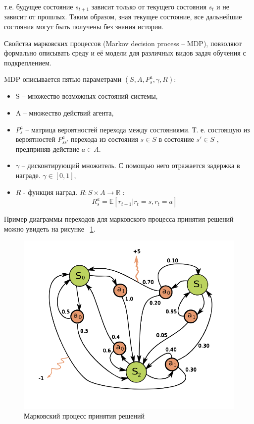 т.е. будущее состояние $s_{t+1}$ зависит только от текущего состояния $s_t$ и не зависит от прошлых. Таким образом, зная текущее состояние, все дальнейшие состояния могут быть получены без знания истории. 
 
 Свойства марковских процессов (Markov decision process – MDP), повзоляют формально описывать среду и её модели для различных видов задач обучения с подкреплением.

MDP описывается пятью параметрами $(S, A, {P^a_s},\gamma, R)$: 
\begin{itemize}
    \item S -- множество возможных состояний системы,
    \item A --  множество действий агента,
    \item $P_s^a$ -- матрица вероятностей перехода между состояниями. Т. е. состоящую из вероятностей $P^a_{ss'}$ перехода из состояния $s\in S$  в состояние $s' \in S$ , предприняв действие $a \in A$.  
    \item $\gamma$ -- дисконтирующий множитель. С помощью него отражается задержка в награде. $\gamma \in [0, 1],$
    \item $R$ - функция наград. $R : S \times A \to \mathbb{R}$ :
    \begin{equation}
        R_s^a = \mathbb{E} [ r_{t+1} | r_t = s, r_t = a]
    \end{equation}
\end{itemize}

Пример диаграммы переходов для марковского процесса принятия решений можно увидеть на рисунке ~\ref{fig:mdp-pic}. \newpage

\begin{figure}[h]
	\centering
	\includegraphics[scale=0.6]{mdp_pic.png}
	\caption {Марковский процесс принятия решений}	
	\label{fig:mdp-pic}
\end{figure}



